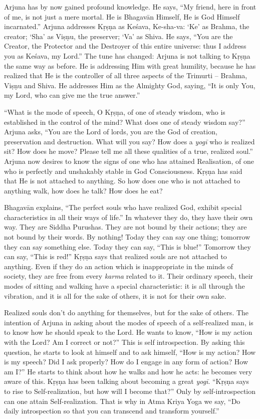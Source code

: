 Arjuna has by now gained profound knowledge. He says, “My friend, here in front of me, is not just a mere mortal. He is Bhagavān Himself, He is God Himself incarnated.” Arjuna addresses Kṛṣṇa as Keśava, Ke-sha-va: ‘Ke’ as Brahma, the creator; ‘Sha’ as Viṣṇu, the preserver; ‘Va’ as Shiva. He says, “You are the Creator, the Protector and the Destroyer of this entire universe: thus I address you as Keśava, my Lord.” The tune has changed: Arjuna is not talking to Kṛṣṇa the same way as before. He is addressing Him with great humility, because he has realized that He is the controller of all three aspects of the Trimurti -- Brahma, Viṣṇu and Shiva. He addresses Him as the Almighty God, saying, “It is only You, my Lord, who can give me the true answer.”

“What is the mode of speech, O Kṛṣṇa, of one of steady wisdom, who is established in the control of the mind? What does one of steady wisdom say?” Arjuna asks, “You are the Lord of lords, you are the God of creation, preservation and destruction. What will you say? How does a \textit{yogī} who is realized sit? How does he move? Please tell me all these qualities of a true, realized soul.” Arjuna now desires to know the signs of one who has attained Realisation, of one who is perfectly and unshakably stable in God Consciousness. Kṛṣṇa has said that He is not attached to anything. So how does one who is not attached to anything walk, how does he talk? How does he eat?

Bhagavān explains, “The perfect souls who have realized God, exhibit special characteristics in all their ways of life.” In whatever they do, they have their own way. They are Siddha Purushas. They are not bound by their actions; they are not bound by their words. By nothing! Today they can say one thing; tomorrow they can say something else. Today they can say, “This is blue!” Tomorrow they can say, “This is red!” Kṛṣṇa says that realized souls are not attached to anything. Even if they do an action which is inappropriate in the minds of society, they are free from every \textit{karma} related to it. Their ordinary speech, their modes of sitting and walking have a special characteristic: it is all through the vibration, and it is all for the sake of others, it is not for their own sake.

Realized souls don’t do anything for themselves, but for the sake of others. The intention of Arjuna in asking about the modes of speech of a self-realized man, is to know how he should speak to the Lord. He wants to know, “How is my action with the Lord? Am I correct or not?” This is selfintrospection. By asking this question, he starts to look at himself and to ask himself, “How is my action? How is my speech? Did I ask properly? How do I engage in any form of action? How am I?” He starts to think about how he walks and how he acts: he becomes very aware of this. Kṛṣṇa has been talking about becoming a great \textit{yogī}. “Kṛṣṇa says to rise to Self-realization, but how will I become that?” Only by self-introspection can one attain Self-realization. That is why in Atma Kriya Yoga we say, “Do daily introspection so that you can transcend and transform yourself.”

